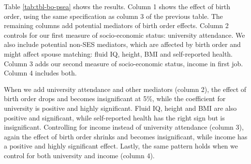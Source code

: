 \documentclass[
  12pt,
]{article}
\theoremstyle{definition}
\theoremstyle{definition}
\theoremstyle{definition}
\theoremstyle{definition}
\theoremstyle{remark}
\begin{document}
Table \ref{tab:tbl-bo-psea} shows the results. Column 1 shows the
effect of birth order, using the same specification as column 3 of the
previous table. The remaining columns add potential mediators of birth
order effects. Column 2 controls for our first measure of socio-economic
status: university attendance. We also include potential non-SES
mediators, which are affected by birth order and might affect spouse
matching: fluid IQ, height, BMI and self-reported health. Column 3 adds
our second measure of socio-economic status, income in first job. Column
4 includes both.

When we add university attendance and other mediators (column 2), the
effect of birth order drops and becomes insignificant at 5\%, while the
coefficient for university is positive and highly significant. Fluid IQ,
height and BMI are also positive and significant, while self-reported
health has the right sign but is insignificant. Controlling for income
instead of university attendance (column 3), again the effect of birth
order shrinks and becomes insignificant, while income has a positive and
highly significant effect. Lastly, the same pattern holds when we
control for both university and income (column 4).

 
  \providecommand{\huxb}[2]{\arrayrulecolor[RGB]{#1}\global\arrayrulewidth=#2pt}
  \providecommand{\huxvb}[2]{\color[RGB]{#1}\vrule width #2pt}
  \providecommand{\huxtpad}[1]{\rule{0pt}{#1}}
  \providecommand{\huxbpad}[1]{\rule[-#1]{0pt}{#1}}
\end{document}
